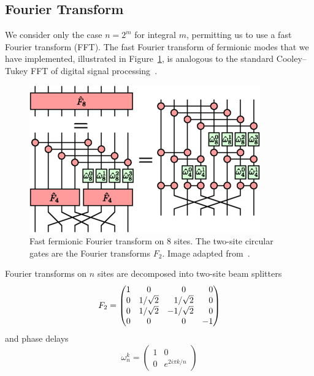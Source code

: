\documentclass[12pt, twocolumn]{article}
\newcommand*{\eu}{e}
\newcommand*{\iu}{i}
\begin{document}
  \subsection{Fourier Transform}
  We consider only the case \( n = 2^{m} \) for integral \( m \), permitting us to use a fast Fourier transform (FFT). The fast Fourier transform of fermionic modes that we have implemented, illustrated in Figure~\ref{fig:ffft}, is analogous to the standard Cooley--Tukey FFT of digital signal processing~\cite{Cooley1965}.
  \begin{figure}
    \centering
    \includegraphics[width=\linewidth]{images/ffft.png}
    \caption{Fast fermionic Fourier transform on \( 8 \) sites. The two-site circular gates are the Fourier transforms \( F_{2} \). Image adapted from~\cite{Ferris2014}.%
      \label{fig:ffft}}
  \end{figure}
  Fourier transforms on \( n \) sites are decomposed into two-site beam splitters
  \begin{equation}
    F_{2}
      = \begin{pmatrix}
          1 & 0            & \hphantom{-}0            & \hphantom{-}0 \\
          0 & 1 / \sqrt{2} & \hphantom{-}1 / \sqrt{2} & \hphantom{-}0 \\
          0 & 1 / \sqrt{2} &           - 1 / \sqrt{2} & \hphantom{-}0 \\
          0 & 0            & \hphantom{-}0            &           - 1
        \end{pmatrix}
  \end{equation}
  and phase delays
  \begin{equation}
    \omega_{n}^{k}
      = \begin{pmatrix}
          1 & 0 \\
          0 & \eu^{2 \iu \pi k / n}
        \end{pmatrix}
  \end{equation}
\end{document}
